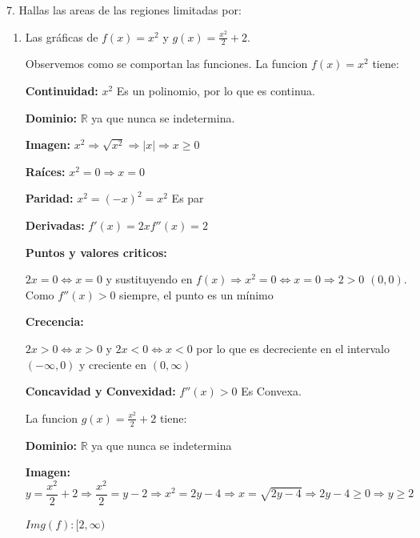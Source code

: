 \documentclass[12pt]{article}
\begin{document}
7. Hallas las areas de las regiones limitadas por:

\begin{enumerate}[\hspace{9px} a)]
    \item Las gr\'aficas de \(f(x)=x^2\) y \(g(x)=\displaystyle\frac{x^2}{2}+2\).\bigskip
    
        Observemos como se comportan las funciones. 
        La funcion \(f(x)=x^2\) tiene:\medskip

        \textbf{Continuidad: }\(x^2\) Es un polinomio, por lo que es continua.\medskip

        \textbf{Dominio: }\(\mathbb{R}\) ya que nunca se indetermina.\medskip
        
        \textbf{Imagen: }\(x^2 \Rightarrow\sqrt{x^2}\Rightarrow|x|\Rightarrow x\geq 0\)\medskip

        \textbf{Ra\'ices: }\(x^2=0\Rightarrow x=0\)\medskip

        \textbf{Paridad: }\(x^2=(-x)^2=x^2\) Es par\medskip

        \textbf{Derivadas: }\(f'(x)=2x\)\qquad\(f''(x)=2\)  \medskip

        \textbf{Puntos y valores criticos: }\medskip
        
        \(2x=0 \Leftrightarrow x=0\) y sustituyendo en \(f(x) \Rightarrow x^2=0 \Leftrightarrow x=0\Rightarrow 2>0\) \((0,0)\). Como \(f''(x)>0\) siempre, el punto es un m\'inimo\medskip

        \textbf{Crecencia: }\medskip
        
        \(2x>0 \Leftrightarrow x>0\) y \(2x<0 \Leftrightarrow x<0\) por lo que es decreciente en el intervalo \((-\infty,0)\) y creciente en \((0,\infty)\)\medskip

        \textbf{Concavidad y Convexidad: }\quad\(f''(x)>0\) Es Convexa.\bigskip
        
        La funcion \(g(x)=\displaystyle\frac{x^2}{2}+2\) tiene:\medskip

        \textbf{Dominio: }\(\mathbb{R}\) ya que nunca se indetermina \medskip

        \textbf{Imagen: }
        \[y=\frac{x^2}{2}+2 \Rightarrow \frac{x^2}{2}=y-2 \Rightarrow x^2=2y-4 \Rightarrow x=\sqrt{2y-4} \Longrightarrow 2y-4\geq0 \Rightarrow y\geq2\]

        \(Img(f): [2,\infty)\)\medskip


\end{enumerate}
\end{document}
